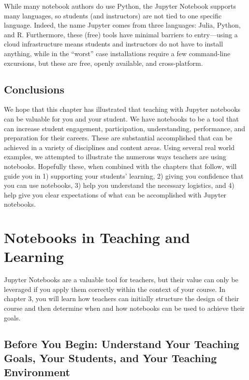 \documentclass[]{book}
\begin{document}
While many notebook authors do use Python, the Jupyter Notebook supports
many languages, so students (and instructors) are not tied to one
specific language. Indeed, the name Jupyter comes from three languages:
Julia, Python, and R. Furthermore, these (free) tools have minimal
barriers to entry---using a cloud infrastructure means students and
instructors do not have to install anything, while in the ``worst'' case
installations require a few command-line excursions, but these are free,
openly available, and cross-platform.

\section{Conclusions}\label{conclusions}

We hope that this chapter has illustrated that teaching with Jupyter
notebooks can be valuable for you and your student. We have notebooks to
be a tool that can increase student engagement, participation,
understanding, performance, and preparation for their careers. These are
substantial accomplished that can be achieved in a variety of
disciplines and content areas. Using several real world examples, we
attempted to illustrate the numerous ways teachers are using notebooks.
Hopefully these, when combined with the chapters that follow, will guide
you in 1) supporting your students' learning, 2) giving you confidence
that you can use notebooks, 3) help you understand the necessary
logistics, and 4) help give you clear expectations of what can be
accomplished with Jupyter notebooks.

\chapter{Notebooks in Teaching and
Learning}\label{notebooks-in-teaching-and-learning}

Jupyter Notebooks are a valuable tool for teachers, but their value can
only be leveraged if you apply them correctly within the context of your
course. In chapter 3, you will learn how teachers can initially
structure the design of their course and then determine when and how
notebooks can be used to achieve their goals.

\section{Before You Begin: Understand Your Teaching Goals, Your
Students, and Your Teaching
Environment}\label{before-you-begin-understand-your-teaching-goals-your-students-and-your-teaching-environment}
\end{document}
